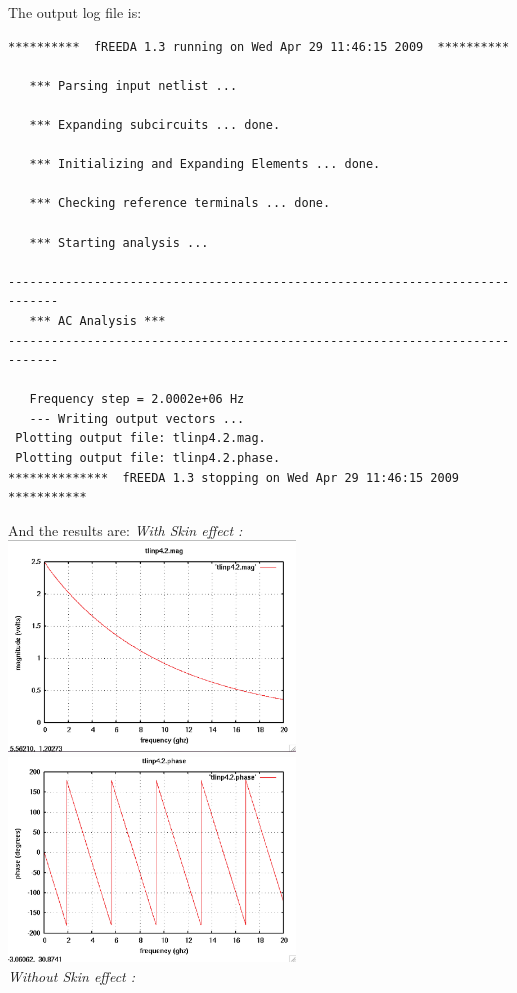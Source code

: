 \documentclass{article}
\begin{document}
{The output log file is:
\begin{verbatim}
**********  fREEDA 1.3 running on Wed Apr 29 11:46:15 2009  **********

   *** Parsing input netlist ...

   *** Expanding subcircuits ... done.

   *** Initializing and Expanding Elements ... done.

   *** Checking reference terminals ... done.

   *** Starting analysis ...

-----------------------------------------------------------------------------
   *** AC Analysis ***
-----------------------------------------------------------------------------

   Frequency step = 2.0002e+06 Hz
   --- Writing output vectors ...
 Plotting output file: tlinp4.2.mag.
 Plotting output file: tlinp4.2.phase.
**************  fREEDA 1.3 stopping on Wed Apr 29 11:46:15 2009  ***********
\end{verbatim}
And the results are: 
\newline
\emph{With Skin effect : }
\newline
\includegraphics[width=3in]{tlinp4.2.mag.eps}\hfill
\includegraphics[width=3in]{tlinp4.2.phase.eps}\hspace*{\fill}
~\\
\emph{Without Skin effect : }
}
\end{document}
